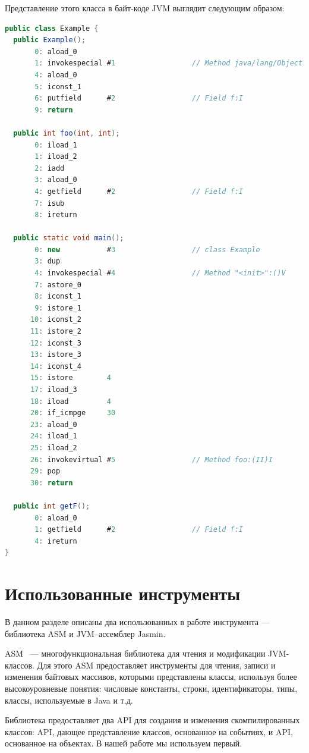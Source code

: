 Представление этого класса в байт-коде JVM выглядит следующим образом:

\begin{lstlisting}[language = Java]
public class Example {
  public Example();
       0: aload_0
       1: invokespecial #1                  // Method java/lang/Object."<init>":()V
       4: aload_0
       5: iconst_1
       6: putfield      #2                  // Field f:I
       9: return

  public int foo(int, int);
       0: iload_1
       1: iload_2
       2: iadd
       3: aload_0
       4: getfield      #2                  // Field f:I
       7: isub
       8: ireturn

  public static void main();
       0: new           #3                  // class Example
       3: dup
       4: invokespecial #4                  // Method "<init>":()V
       7: astore_0
       8: iconst_1
       9: istore_1
      10: iconst_2
      11: istore_2
      12: iconst_3
      13: istore_3
      14: iconst_4
      15: istore        4
      17: iload_3
      18: iload         4
      20: if_icmpge     30
      23: aload_0
      24: iload_1
      25: iload_2
      26: invokevirtual #5                  // Method foo:(II)I
      29: pop
      30: return

  public int getF();
       0: aload_0
       1: getfield      #2                  // Field f:I
       4: ireturn
}
\end{lstlisting}


\section{Использованные инструменты}

В данном разделе описаны два использованных в работе инструмента --- библиотека ASM и JVM--ассемблер Jasmin.

ASM~\cite{asm_guide} --- многофункциональная библиотека для чтения и модификации JVM-классов. Для этого ASM предоставляет инструменты для чтения, записи и изменения байтовых массивов, которыми представлены классы, используя более высокоуровневые понятия: числовые константы, строки, идентификаторы, типы, классы, используемые в Java и т.д. 

Библиотека предоставляет два API для создания и изменения скомпилированных классов: API, дающее представление классов, основанное на событиях, и API, основанное на объектах. В нашей работе мы используем первый.

